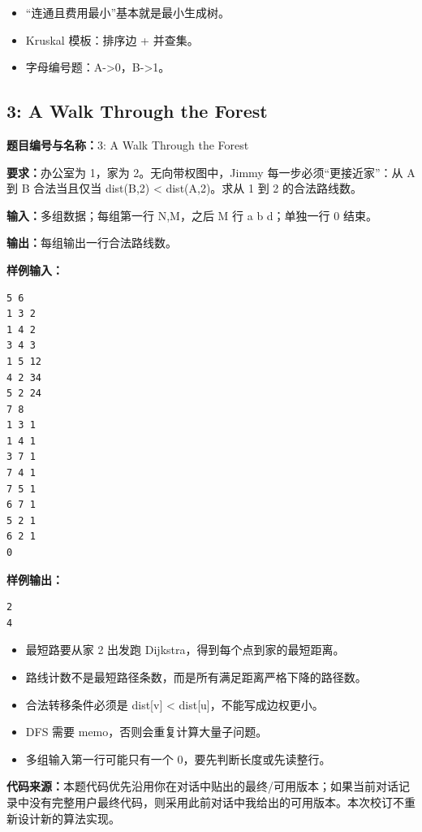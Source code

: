 \documentclass[10pt,a4paper,fontset=none]{ctexart}
\newcommand{\codesource}{\par\noindent\textbf{代码来源：}本题代码优先沿用你在对话中贴出的最终/可用版本；如果当前对话记录中没有完整用户最终代码，则采用此前对话中我给出的可用版本。本次校订不重新设计新的算法实现。\par\vspace{0.2em}}
\begin{document}
\begin{notebox}
\begin{itemize}
  \item “连通且费用最小”基本就是最小生成树。
  \item Kruskal 模板：排序边 + 并查集。
  \item 字母编号题：A->0，B->1。
\end{itemize}
\end{notebox}


\subsection{3: A Walk Through the Forest}
\begin{taskbox}
\textbf{题目编号与名称：}3: A Walk Through the Forest\par
\textbf{要求：}办公室为 1，家为 2。无向带权图中，Jimmy 每一步必须“更接近家”：从 A 到 B 合法当且仅当 dist(B,2) < dist(A,2)。求从 1 到 2 的合法路线数。\par
\textbf{输入：}多组数据；每组第一行 N,M，之后 M 行 a b d；单独一行 0 结束。\par
\textbf{输出：}每组输出一行合法路线数。\par
\textbf{样例输入：}
\begin{lstlisting}[style=sample]
5 6
1 3 2
1 4 2
3 4 3
1 5 12
4 2 34
5 2 24
7 8
1 3 1
1 4 1
3 7 1
7 4 1
7 5 1
6 7 1
5 2 1
6 2 1
0
\end{lstlisting}
\textbf{样例输出：}
\begin{lstlisting}[style=sample]
2
4
\end{lstlisting}
\end{taskbox}
\begin{mistakebox}
\begin{itemize}
  \item 最短路要从家 2 出发跑 Dijkstra，得到每个点到家的最短距离。
  \item 路线计数不是最短路径条数，而是所有满足距离严格下降的路径数。
  \item 合法转移条件必须是 dist[v] < dist[u]，不能写成边权更小。
  \item DFS 需要 memo，否则会重复计算大量子问题。
  \item 多组输入第一行可能只有一个 0，要先判断长度或先读整行。
\end{itemize}
\end{mistakebox}
\codesource
\end{document}
